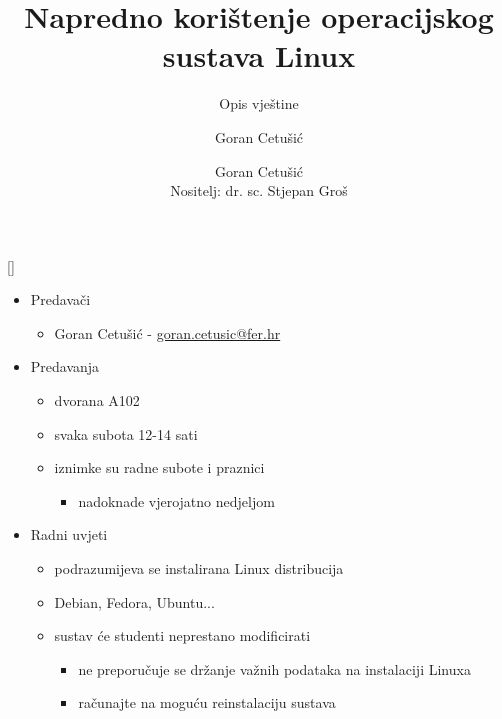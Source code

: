 \documentclass[croatian,t]{beamer} %
\title[NKOSL]{Napredno korištenje operacijskog sustava Linux}
\subtitle{Opis vještine}
\author{Goran Cetušić}
\author[Goran Cetušić]{Goran Cetušić\\{\small Nositelj: dr. sc. Stjepan Groš}}
\institute[FER]{Sveučilište u Zagrebu \\
				Fakultet elektrotehnike i računarstva}
\date{\todayiso}
\begin{document}
    {
    [] %
    \begin{frame}
        \maketitle
    \end{frame}
    }
    
    \begin{frame}
    	\begin{itemize}
    		\item Predavači
    		\begin{itemize}
    			\item Goran Cetušić - \href{mailto:goran.cetusic@fer.hr}{goran.cetusic@fer.hr}
    		\end{itemize}
    		\item Predavanja
    		\begin{itemize}
    			\item dvorana A102
    			\item svaka subota 12-14 sati
    			\item iznimke su radne subote i praznici
    			\begin{itemize}
    				\item nadoknade vjerojatno nedjeljom
    			\end{itemize}
    		\end{itemize}
    		\item Radni uvjeti
    		\begin{itemize}
    			\item podrazumijeva se instalirana Linux distribucija
    			\item Debian, Fedora, Ubuntu...
    			\item sustav će studenti neprestano modificirati
    			\begin{itemize}
    				\item ne preporučuje se držanje važnih podataka na instalaciji Linuxa
    				\item računajte na moguću reinstalaciju sustava
    			\end{itemize}
    		\end{itemize}
    	\end{itemize}
	\end{frame}
	
\end{document}
